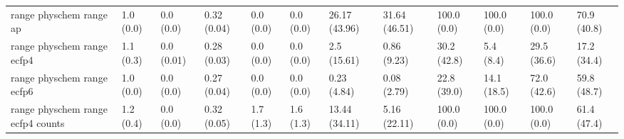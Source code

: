 \begin{tabular}{llllllllllll}
range physchem range ap & {\cellcolor[HTML]{F6FCFD}} \color[HTML]{000000} 1.0 (0.0) & {\cellcolor[HTML]{F7FCFD}} \color[HTML]{000000} 0.0 (0.0) & {\cellcolor[HTML]{63C0A0}} \color[HTML]{000000} 0.32 (0.04) & {\cellcolor[HTML]{F7FCFD}} \color[HTML]{000000} 0.0 (0.0) & {\cellcolor[HTML]{F7FCFD}} \color[HTML]{000000} 0.0 (0.0) & {\cellcolor[HTML]{C7EAE3}} \color[HTML]{000000} 26.17 (43.96) & {\cellcolor[HTML]{B0E1D6}} \color[HTML]{000000} 31.64 (46.51) & {\cellcolor[HTML]{00441B}} \color[HTML]{F1F1F1} 100.0 (0.0) & {\cellcolor[HTML]{00441B}} \color[HTML]{F1F1F1} 100.0 (0.0) & {\cellcolor[HTML]{00441B}} \color[HTML]{F1F1F1} 100.0 (0.0) & {\cellcolor[HTML]{E9F7FA}} \color[HTML]{000000} 70.9 (40.8) \\
range physchem range ecfp4 & {\cellcolor[HTML]{F6FCFD}} \color[HTML]{000000} 1.1 (0.3) & {\cellcolor[HTML]{F7FCFD}} \color[HTML]{000000} 0.0 (0.01) & {\cellcolor[HTML]{56BA91}} \color[HTML]{F1F1F1} 0.28 (0.03) & {\cellcolor[HTML]{F7FCFD}} \color[HTML]{000000} 0.0 (0.0) & {\cellcolor[HTML]{F7FCFD}} \color[HTML]{000000} 0.0 (0.0) & {\cellcolor[HTML]{F4FBFC}} \color[HTML]{000000} 2.5 (15.61) & {\cellcolor[HTML]{F6FCFD}} \color[HTML]{000000} 0.86 (9.23) & {\cellcolor[HTML]{00441B}} \color[HTML]{F1F1F1} 30.2 (42.8) & {\cellcolor[HTML]{00441B}} \color[HTML]{F1F1F1} 5.4 (8.4) & {\cellcolor[HTML]{00441B}} \color[HTML]{F1F1F1} 29.5 (36.6) & {\cellcolor[HTML]{44AF79}} \color[HTML]{F1F1F1} 17.2 (34.4) \\
range physchem range ecfp6 & {\cellcolor[HTML]{F6FCFD}} \color[HTML]{000000} 1.0 (0.0) & {\cellcolor[HTML]{F7FCFD}} \color[HTML]{000000} 0.0 (0.0) & {\cellcolor[HTML]{47B17E}} \color[HTML]{F1F1F1} 0.27 (0.04) & {\cellcolor[HTML]{F7FCFD}} \color[HTML]{000000} 0.0 (0.0) & {\cellcolor[HTML]{F7FCFD}} \color[HTML]{000000} 0.0 (0.0) & {\cellcolor[HTML]{F7FCFD}} \color[HTML]{000000} 0.23 (4.84) & {\cellcolor[HTML]{F7FCFD}} \color[HTML]{000000} 0.08 (2.79) & {\cellcolor[HTML]{00441B}} \color[HTML]{F1F1F1} 22.8 (39.0) & {\cellcolor[HTML]{00441B}} \color[HTML]{F1F1F1} 14.1 (18.5) & {\cellcolor[HTML]{00441B}} \color[HTML]{F1F1F1} 72.0 (42.6) & {\cellcolor[HTML]{D6F0EE}} \color[HTML]{000000} 59.8 (48.7) \\
range physchem range ecfp4 counts & {\cellcolor[HTML]{F5FBFD}} \color[HTML]{000000} 1.2 (0.4) & {\cellcolor[HTML]{F7FCFD}} \color[HTML]{000000} 0.0 (0.0) & {\cellcolor[HTML]{74C8AE}} \color[HTML]{000000} 0.32 (0.05) & {\cellcolor[HTML]{F7FCFD}} \color[HTML]{000000} 1.7 (1.3) & {\cellcolor[HTML]{F7FCFD}} \color[HTML]{000000} 1.6 (1.3) & {\cellcolor[HTML]{E3F4F8}} \color[HTML]{000000} 13.44 (34.11) & {\cellcolor[HTML]{F0F9FB}} \color[HTML]{000000} 5.16 (22.11) & {\cellcolor[HTML]{00441B}} \color[HTML]{F1F1F1} 100.0 (0.0) & {\cellcolor[HTML]{00441B}} \color[HTML]{F1F1F1} 100.0 (0.0) & {\cellcolor[HTML]{00441B}} \color[HTML]{F1F1F1} 100.0 (0.0) & {\cellcolor[HTML]{2D9655}} \color[HTML]{F1F1F1} 61.4 (47.4) \\

\end{tabular}
